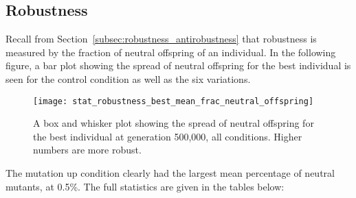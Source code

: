 \subsection{Robustness}
Recall from Section~\ref{subsec:robustness_antirobustness} that robustness is measured by the fraction of neutral offspring of an individual. In the following figure, a bar plot showing the spread of neutral offspring for the best individual is seen for the control condition as well as the six variations. 

\begin{figure}[H]
	\centering
	\texttt{[image: stat\_robustness\_best\_mean\_frac\_neutral\_offspring]}
	\caption[Robustness box and whisker plot]{A box and whisker plot showing the spread of neutral offspring for the best individual at generation 500,000, all conditions. Higher numbers are more robust.}
	\label{fig:mean_robustness_all_conditions}
\end{figure}
The mutation up condition clearly had the largest mean percentage of neutral mutants, at 0.5\%. The full statistics are given in the tables below:

